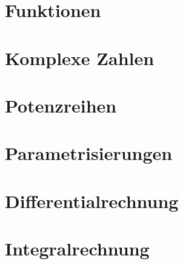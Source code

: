 \documentclass[numerate]{cheatsheet}
\author{Micha Bosshart - bmicha@ethz.ch \\ \vspace*{0.2em} \normalsize{ergänzt von Noa Sendlhofer \& Christian Leser} \vspace*{-0.2em}}
\begin{document}
    \section{Funktionen}
        
        
        
        
    \section{Komplexe Zahlen}
        
        
        
    \section{Potenzreihen}
        
        
        
    \section{Parametrisierungen}
        
        
        \vfill \null \columnbreak
    \section{Differentialrechnung}
        
        
        
        
        
    \section{Integralrechnung}
        
        
        
        
        
        
        
        
        \vfill \null \columnbreak
        
        
        \vfill \null \columnbreak
\end{document}

